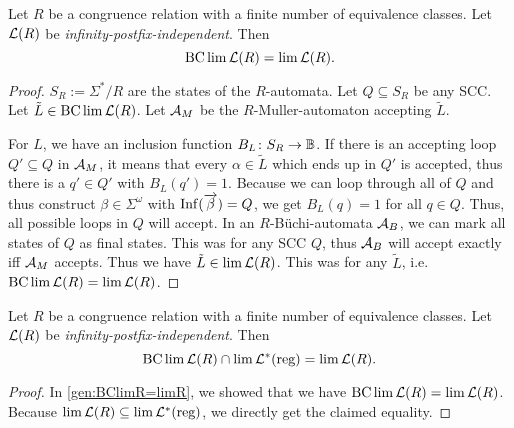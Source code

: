 \begin{lemma}
\label{gen:BClimR=limR}
Let $R$ be a congruence relation with a finite number of equivalence classes. Let $\mathcal{L}(R)$ be \emph{infinity-postfix-independent}. Then %
\[ \operatorname{BC} \lim \mathcal{L}(R) = \lim \mathcal{L}(R) . \]
\begin{proof}
$S_R := \Sigma^*/R$ are the states of the $R$-automata. Let $Q \subseteq S_R$ be any SCC. Let $\tilde L \in \operatorname{BC} \lim \mathcal{L}(R)$. Let $\mathcal{A}_M$ be the $R$-Muller-automaton accepting $\tilde L$.

For $L$, we have an inclusion function $B_L \colon S_R \rightarrow \mathbb{B}$. If there is an accepting loop $Q' \subseteq Q$ in $\mathcal{A}_M$, it means that every $\alpha \in \tilde L$ which ends up in $Q'$ is accepted, thus there is a $q' \in Q'$ with $B_L(q') = 1$. Because we can loop through all of $Q$ and thus construct $\beta \in \Sigma^\omega$ with $\operatorname{Inf}(\overrightarrow \beta) = Q$, we get $B_L(q) = 1$ for all $q \in Q$. Thus, all possible loops in $Q$ will accept. In an $R$-Büchi-automata $\mathcal{A}_B$, we can mark all states of $Q$ as final states. This was for any SCC $Q$, thus $\mathcal{A}_B$ will accept exactly iff $\mathcal{A}_M$ accepts. Thus we have $\tilde L \in \lim \mathcal{L}(R)$. This was for any $\tilde L$, i.e. $\operatorname{BC} \lim \mathcal{L}(R) = \lim \mathcal{L}(R)$.
%
%
\end{proof}
\end{lemma}

\begin{lemma}
\label{gen:bcLimLReg-and-limL}
Let $R$ be a congruence relation with a finite number of equivalence classes. Let $\mathcal{L}(R)$ be \emph{infinity-postfix-independent}. Then
\[ \operatorname{BC} \lim \mathcal{L}(R) \cap \lim \mathcal{L}^*(\text{reg}) = \lim \mathcal{L}(R) . \]

\begin{proof}
In \cref{gen:BClimR=limR}, we showed that we have $\operatorname{BC} \lim \mathcal{L}(R) = \lim \mathcal{L}(R)$. Because $\lim \mathcal{L}(R) \subseteq \lim \mathcal{L}^*(\text{reg})$, we directly get the claimed equality.
\end{proof}
\end{lemma}

